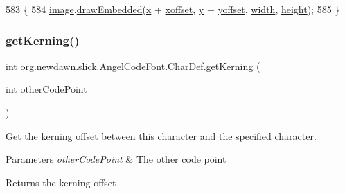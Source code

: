 \begin{DoxyCode}
583                                            \{
584             \mbox{\hyperlink{classorg_1_1newdawn_1_1slick_1_1_angel_code_font_1_1_char_def_ab62aa3bc9bf07629c6df438860b2fe73}{image}}.\mbox{\hyperlink{classorg_1_1newdawn_1_1slick_1_1_image_a5a8910fb31d9350d0c70fe7717172034}{drawEmbedded}}(\mbox{\hyperlink{classorg_1_1newdawn_1_1slick_1_1_angel_code_font_1_1_char_def_a528f233655a70cbf7dcbae24d6bb3ae4}{x}} + \mbox{\hyperlink{classorg_1_1newdawn_1_1slick_1_1_angel_code_font_1_1_char_def_a8d1f56182f664e1a5eb87fc028c2445f}{xoffset}}, \mbox{\hyperlink{classorg_1_1newdawn_1_1slick_1_1_angel_code_font_1_1_char_def_a00004936be32e58efcc3b1da7d97108b}{y}} + 
      \mbox{\hyperlink{classorg_1_1newdawn_1_1slick_1_1_angel_code_font_1_1_char_def_af7a97bd6030d18c7ef9dc4fecaf2639c}{yoffset}}, \mbox{\hyperlink{classorg_1_1newdawn_1_1slick_1_1_angel_code_font_1_1_char_def_a2a89d623dcb4a2faadfa804a76bdf6d9}{width}}, \mbox{\hyperlink{classorg_1_1newdawn_1_1slick_1_1_angel_code_font_1_1_char_def_a22e24871275204c15c2e4a96875d8e57}{height}});
585         \}
\end{DoxyCode}
\mbox{\label{classorg_1_1newdawn_1_1slick_1_1_angel_code_font_1_1_char_def_a3b153d43da2f6f3b07e49804b762470d}} 
\subsubsection{\texorpdfstring{get\+Kerning()}{getKerning()}}
{\footnotesize\ttfamily int org.\+newdawn.\+slick.\+Angel\+Code\+Font.\+Char\+Def.\+get\+Kerning (\begin{DoxyParamCaption}\item[{int}]{other\+Code\+Point }\end{DoxyParamCaption})\hspace{0.3cm}{\ttfamily [inline]}}

Get the kerning offset between this character and the specified character. 
\begin{DoxyParams}{Parameters}
{\em other\+Code\+Point} & The other code point \\
\hline
\end{DoxyParams}
\begin{DoxyReturn}{Returns}
the kerning offset 
\end{DoxyReturn}

